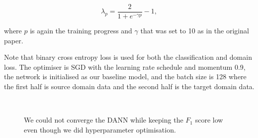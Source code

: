 \begin{equation}
	\lambda_p = \frac{2}{1 + e^{-\gamma p}} - 1,
\end{equation}

where \(p\) is again the training progress
and \(\gamma\) that was set to 10 as in the original paper.

Note that binary cross entropy loss is used for both the classification and domain loss.
The optimiser is SGD with the learning rate schedule and momentum 0.9,
the network is initialised as our baseline model,
and the batch size is 128
where the first half is source domain data and the second half is the target domain data.

\begin{figure}
\begin{center}
\\
\end{center}
\caption[Training of Domain-Adversarial Neural Network]{
	We could not converge the DANN while keeping the \(F_1\) score low
	even though we did hyperparameter optimisation.
}
\label{dann_training}
\end{figure}

